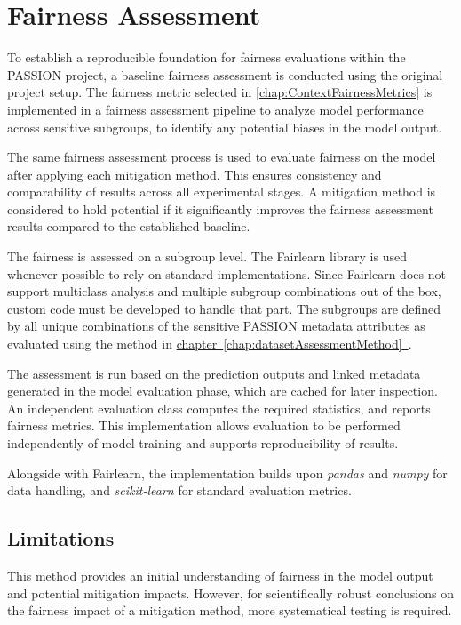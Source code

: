 \documentclass[12pt, a4paper, oneside]{book}   	%
\newcommand{\linkchap}[1]{\hyperref[#1]{chapter~\ref{#1}~\nameref{#1}}}
\begin{document}
				
		\section{Fairness Assessment}\label{chap:fairnessAssessmentMethod}
		To establish a reproducible foundation for fairness evaluations within the PASSION project, a baseline fairness assessment is conducted using the original project setup. The fairness metric selected in \autoref{chap:ContextFairnessMetrics} is implemented in a fairness assessment pipeline to analyze model performance across sensitive subgroups, to identify any potential biases in the model output.
		
		The same fairness assessment process is used to evaluate fairness on the model after applying each mitigation method. This ensures consistency and comparability of results across all experimental stages. A mitigation method is considered to hold potential if it significantly improves the fairness assessment results compared to the established baseline.
		
		The fairness is assessed on a subgroup level. The \gls{Fairlearn} library is used whenever possible to rely on standard implementations. Since \gls{Fairlearn} does not support multiclass analysis and multiple subgroup combinations out of the box, custom code must be developed to handle that part.
		The subgroups are defined by all unique combinations of the sensitive PASSION metadata attributes as evaluated using the method in \linkchap{chap:datasetAssessmentMethod}.
		
		The assessment is run based on the prediction outputs and linked metadata generated in the model evaluation phase, which are cached for later inspection. An independent evaluation class computes the required statistics, and reports fairness metrics. This implementation allows evaluation to be performed independently of model training and supports reproducibility of results.
		
		Alongside with \gls{Fairlearn}, the implementation builds upon \textit{pandas} and \textit{numpy} for data handling, and \textit{scikit-learn} for standard evaluation metrics.
		
		\subsection{Limitations}
			This method provides an initial understanding of fairness in the model output and potential mitigation impacts. However, for scientifically robust conclusions on the fairness impact of a mitigation method, more systematical testing is required.
			
\end{document}

